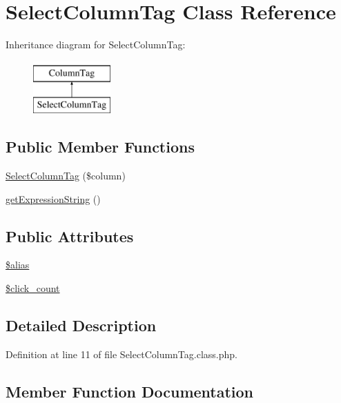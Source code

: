 \hypertarget{classSelectColumnTag}{}\section{Select\+Column\+Tag Class Reference}
\label{classSelectColumnTag}
Inheritance diagram for Select\+Column\+Tag\+:\begin{figure}[H]
\begin{center}
\leavevmode
\includegraphics[height=2.000000cm]{classSelectColumnTag}
\end{center}
\end{figure}
\subsection*{Public Member Functions}
\begin{DoxyCompactItemize}
\item 
\hyperlink{classSelectColumnTag_a05e82794cb692f0af9a7da2eb41a229d}{Select\+Column\+Tag} (\$column)
\item 
\hyperlink{classSelectColumnTag_a4e4b646d742cb51b7c72f0d953717e3a}{get\+Expression\+String} ()
\end{DoxyCompactItemize}
\subsection*{Public Attributes}
\begin{DoxyCompactItemize}
\item 
\hyperlink{classSelectColumnTag_a152fca9e152d65e4697ad823ffaa101b}{\$alias}
\item 
\hyperlink{classSelectColumnTag_a5965b8a6c68685c6b99dd88f4fd87f52}{\$click\+\_\+count}
\end{DoxyCompactItemize}


\subsection{Detailed Description}


Definition at line 11 of file Select\+Column\+Tag.\+class.\+php.



\subsection{Member Function Documentation}
\mbox{\label{classSelectColumnTag_a4e4b646d742cb51b7c72f0d953717e3a}} 
